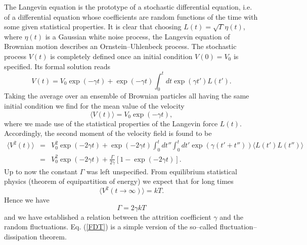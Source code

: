 The Langevin equation is the prototype of a stochastic 
differential equation, i.e. of a differential equation whose
coefficients are random functions of the time with some given
statistical properties. 
It is clear that choosing $L(t)=\sqrt{\Gamma} \eta(t)$,
where $\eta(t)$ is a Gaussian white noise process, the Langevin 
equation of Brownian motion describes an Ornstein--Uhlenbeck
process.
The stochastic process $V(t)$ is 
completely defined once an initial condition $V(0)=V_0$ is specified.
Its formal solution reads
\begin{equation*}
V(t) = V_0 \exp(-\gamma t) + \exp(-\gamma t) 
    \int_0^t dt \exp(\gamma t') L(t').
\end{equation*}
Taking the average over an ensemble of Brownian particles all
having the same initial condition we find for the mean value of 
the velocity
\begin{equation*}
\langle V(t) \rangle = V_0 \exp(-\gamma t),
\end{equation*}
where we made use of the statistical properties of the Langevin 
force $L(t)$. Accordingly, the second moment of the velocity field
is found to be
\begin{eqnarray*}
\langle V^2(t) \rangle &=& V_0^2 \exp(-2\gamma t)
          + \exp(-2 \gamma t) \int_0^t dt'' \int_0^t dt'
             \exp(\gamma (t' + t'')) \langle L(t') L(t'') \rangle 
             \\
          &=& V_0^2 \exp(-2\gamma t) + \frac{\Gamma}{2 \gamma}
             [1-\exp(-2 \gamma t)].
\end{eqnarray*}
Up to now the constant $\Gamma$ was left unspecified. From 
equilibrium statistical physics (theorem of equipartition of energy) 
we  expect that for long times 
\begin{equation*}
\langle V^2(t\rightarrow \infty) \rangle = kT.
\end{equation*}
Hence we have
\begin{equation}
\label{FDT}
\Gamma = 2 \gamma kT
\end{equation}
and we have established a relation between the attrition 
coefficient $\gamma$ and the random fluctuations.
Eq. (\ref{FDT}) is a simple version of the so--called
fluctuation--dissipation theorem.


